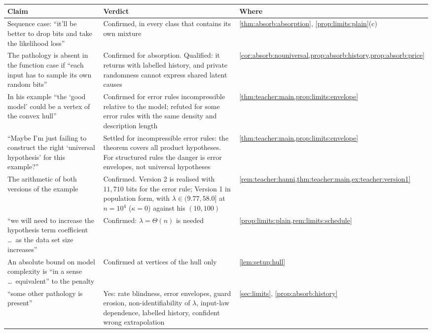 \begin{table}[!t]
\centering\footnotesize\crefabbrev
\begin{tabularx}{\linewidth}{@{}>{\raggedright\arraybackslash}p{4.9cm}>{\raggedright\arraybackslash}X>{\raggedright\arraybackslash}p{2.5cm}@{}}
\toprule
Claim & Verdict & Where\\
\midrule
Sequence case: ``it'll be better to drop bits and take the likelihood loss'' & Confirmed, in every class that contains its own mixture & \cref{thm:absorb:absorption}, \cref{prop:limits:plain}(c)\\
The pathology is absent in the function case if ``each input has to sample its own random bits'' & Confirmed for absorption. Qualified: it returns with labelled history, and private randomness cannot express shared latent causes & \cref{cor:absorb:nouniversal,prop:absorb:history,prop:absorb:price}\\
In his example ``the `good model' could be a vertex of the convex hull'' & Confirmed for error rules incompressible relative to the model; refuted for some error rules with the same density and description length & \cref{thm:teacher:main,prop:limits:envelope}\\
``Maybe I'm just failing to construct the right `universal hypothesis' for this example?'' & Settled for incompressible error rules: the theorem covers all product hypotheses. For structured rules the danger is error envelopes, not universal hypotheses & \cref{thm:teacher:main,prop:limits:envelope}\\
The arithmetic of both versions of the example & Confirmed. Version 2 is realised with $11{,}710$ bits for the error rule; Version 1 in population form, with $\lambda\in(9.77,58.0]$ at $n=10^4$ ($\kappa=0$) against his $(10,100)$ & \cref{rem:teacher:hanni,thm:teacher:main,ex:teacher:version1}\\
``we will need to increase the hypothesis term coefficient \dots\ as the data set size increases'' & Confirmed: $\lambda=\Theta(n)$ is needed & \cref{prop:limits:plain,rem:limits:schedule}\\
An absolute bound on model complexity is ``in a sense \dots\ equivalent'' to the penalty & Confirmed at vertices of the hull only & \cref{lem:setup:hull}\\
``some other pathology is present'' & Yes: rate blindness, error envelopes, guard erosion, non-identifiability of $\lambda$, input-law dependence, labelled history, confident wrong extrapolation & \cref{sec:limits}, \cref{prop:absorb:history}\\

\end{tabularx}
\end{table}
